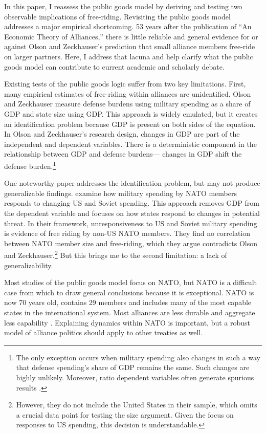 \documentclass[12pt]{article}
\begin{document}
In this paper, I reassess the public goods model by deriving and testing two observable implications of free-riding. 
Revisiting the public goods model addresses a major empirical shortcoming.
53 years after the publication of ``An Economic Theory of Alliances,'' there is little reliable and general evidence for or against Olson and Zeckhauser's prediction that small alliance members free-ride on larger partners. 
Here, I address that lacuna and help clarify what the public goods model can contribute to current academic and scholarly debate. 


Existing tests of the public goods logic suffer from two key limitations.
First, many empirical estimates of free-riding within alliances are unidentified.
Olson and Zeckhauser measure defense burdens using military spending as a share of GDP and state size using GDP.
This approach is widely emulated, but it creates an identification problem because GDP is present on both sides of the equation.
In Olson and Zeckhauser's research design, changes in GDP are part of the independent and dependent variables. 
There is a deterministic component in the relationship between GDP and defense burdens--- changes in GDP shift the defense burden.\footnote{
The only exception occurs when military spending also changes in such a way that defense spending's share of GDP remains the same. Such changes are highly unlikely. Moreover, ratio dependent variables often generate spurious results \citep{Kronmal1993}.}  
 

One noteworthy paper addresses the identification problem, but may not produce generalizable findings. 
\citet{PluemperNeumayer2015} examine how military spending by NATO members responds to changing US and Soviet spending.
This approach removes GDP from the dependent variable and focuses on how states respond to changes in potential threat.  
In their framework, unresponsiveness to US and Soviet military spending is evidence of free riding by non-US NATO members.
They find no correlation between NATO member size and free-riding, which they argue contradicts Olson and Zeckhauser.\footnote{
However, they do not include the United States in their sample, which omits a crucial data point for testing the size argument. Given the focus on responses to US spending, this decision is understandable.}
But this brings me to the second limitation: a lack of generalizability. 


Most studies of the public goods model focus on NATO, but NATO is a difficult case from which to draw general conclusions because it is exceptional. 
NATO is now 70 years old, contains 29 members and includes many of the most capable states in the international system. 
Most alliances are less durable and aggregate less capability \citep{Leedsetal2002}. 
Explaining dynamics within NATO is important, but a robust model of alliance politics should apply to other treaties as well. 
\end{document}
